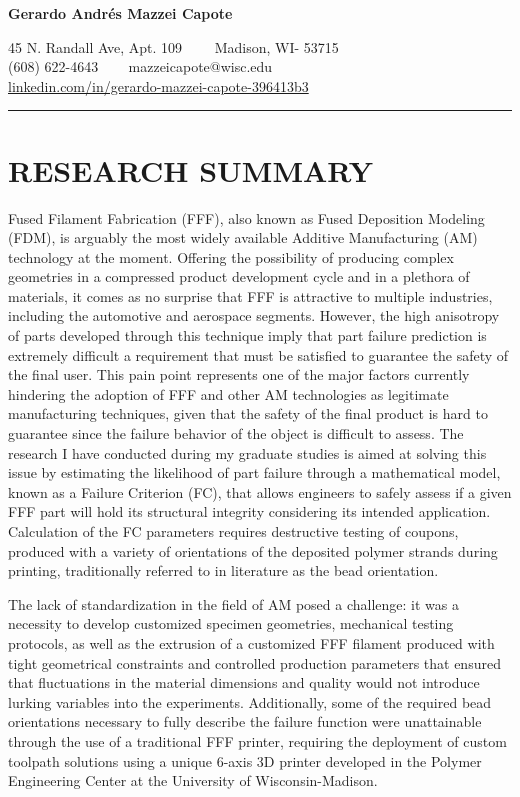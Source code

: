 \documentclass[11pt,letterpaper]{article}
\begin{document}
\begin{center}
	{\LARGE \textbf{Gerardo Andrés Mazzei Capote}}

	45 N. Randall Ave, Apt. 109\ \ \textbullet
	\ \ Madison, WI- 53715
	\\
	(608) 622-4643 \ \textbullet
	\ \ mazzeicapote@wisc.edu\\
	\href{https://www.linkedin.com/in/gerardo-mazzei-capote-396413b3}{linkedin.com/in/gerardo-mazzei-capote-396413b3}
	
\end{center}
\vspace{-0.5em}
\hrule
\vspace{0.4em}
\vspace{-1em}

\section*{RESEARCH SUMMARY}

Fused Filament Fabrication (FFF), also known as Fused Deposition Modeling (FDM), is arguably the most widely available Additive Manufacturing (AM) technology at the moment. Offering the possibility of producing complex geometries in a compressed product development cycle and in a plethora of materials, it comes as no surprise that FFF is attractive to multiple industries, including the automotive and aerospace segments. However, the high anisotropy of parts developed through this technique imply that part failure prediction is extremely difficult \textemdash a requirement that must be satisfied to guarantee the safety of the final user. This pain point represents one of the major factors currently hindering the adoption of FFF and other AM technologies as legitimate manufacturing techniques, given that the safety of the final product is hard to guarantee since the failure behavior of the object is difficult to assess. The research I have conducted during my graduate studies is aimed at solving this issue by estimating the likelihood of part failure through a mathematical model, known as a Failure Criterion (FC), that allows engineers to safely assess if a given FFF part will hold its structural integrity considering its intended application. Calculation of the FC parameters requires destructive testing of coupons, produced with a variety of orientations of the deposited polymer strands during printing, traditionally referred to in literature as the bead orientation.

The lack of standardization in the field of AM posed a challenge: it was a necessity to develop customized specimen geometries, mechanical testing protocols, as well as the extrusion of a customized FFF filament produced with tight geometrical constraints and controlled production parameters that ensured that fluctuations in the material dimensions and quality would not introduce lurking variables into the experiments. Additionally, some of the required bead orientations necessary to fully describe the failure function were unattainable through the use of a traditional FFF printer, requiring the deployment of custom toolpath solutions using a unique 6-axis 3D printer developed in the Polymer Engineering Center at the University of Wisconsin-Madison.    
\end{document}
